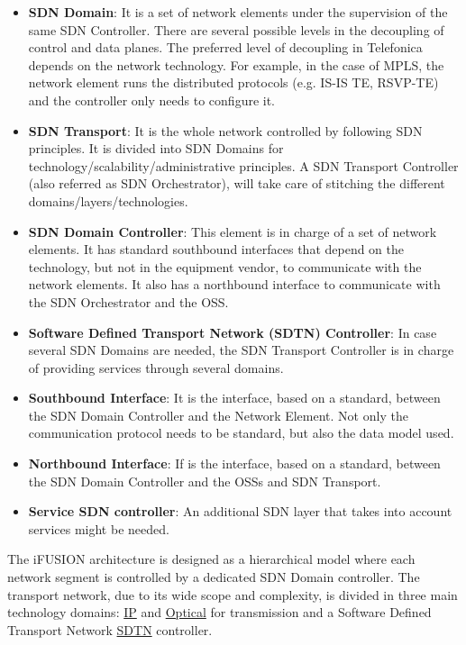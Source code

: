 \documentclass[a4paper,fleqn]{cas-dc}
\begin{document}
\begin{itemize}
\item \textbf{SDN Domain}: It is a set of network elements under the supervision of the same SDN Controller. There are several possible levels in the decoupling of control and data planes. The preferred level of decoupling in Telefonica depends on the network technology. For example, in the case of MPLS, the network element runs the distributed protocols (e.g. IS-IS TE, RSVP-TE) and the controller only needs to configure it.

\item \textbf{SDN Transport}: It is the whole network controlled by following SDN principles. It is divided into SDN Domains for technology/scalability/administrative principles. A SDN Transport Controller (also referred as SDN Orchestrator), will take care of stitching the different domains/layers/technologies.

\item \textbf{SDN Domain Controller}: This element is in charge of a set of network elements. It has standard southbound interfaces that depend on the technology, but not in the equipment vendor, to communicate with the network elements. It also has a northbound interface to communicate with the SDN Orchestrator and the OSS.

\item \textbf{Software Defined Transport Network (SDTN) Controller}: In case several SDN Domains are needed, the SDN Transport Controller is in charge of providing services through several domains. 

\item \textbf{Southbound Interface}: It is the interface, based on a standard, between the SDN Domain Controller and the Network Element. Not only the communication protocol needs to be standard, but also the data model used.

\item \textbf{Northbound Interface}: If is the interface, based on a standard, between the SDN Domain Controller and the OSSs and SDN Transport.

\item \textbf{Service SDN controller}: An additional SDN layer that takes into account services might be needed. 
\end{itemize}

The iFUSION architecture is designed as a hierarchical model where each network segment is controlled by a dedicated SDN Domain controller. The transport network, due to its wide scope and complexity, is divided in three main technology domains: \hyperref[section:ip]{IP} and \hyperref[section:dwdm]{Optical} for transmission and a Software Defined Transport Network \hyperref[section:sdtn]{SDTN} controller.
\end{document}

